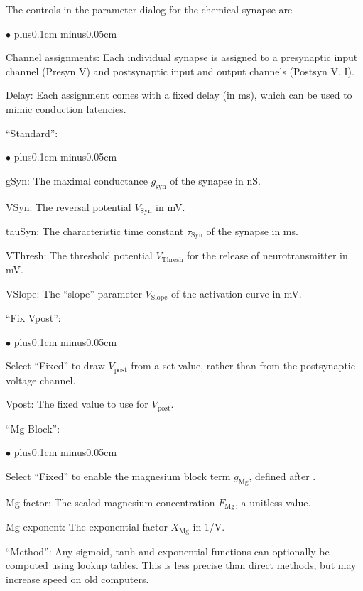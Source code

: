 \documentclass{article}
\newenvironment{myitem}{\begin{list}{$\bullet$}{\setlength{\leftmargin}{1.1em}
\itemsep0.1cm plus0.1cm minus0.05cm
\listparindent0cm
\addtolength{\labelsep}{0.5\labelsep}
\setlength{\labelwidth}{0.8em}
\setlength{\leftmargin}{\labelwidth}
\addtolength{\leftmargin}{\labelsep}
}}{\end{list}}
\begin{document}
  The controls in the parameter dialog for the chemical synapse are
  \begin{myitem}
  \item Channel assignments: Each individual synapse is assigned to a presynaptic input channel
  (Presyn V) and postsynaptic input and output channels (Postsyn V, I).
  \item Delay: Each assignment comes with a fixed delay (in ms), which can be used to mimic
  conduction latencies.
\end{myitem}
``Standard'':
\begin{myitem}
  \item gSyn: The maximal conductance $g_{\text{syn}}$ of the synapse in nS. 
  \item VSyn: The reversal potential $V_{\text{Syn}}$ in mV. 
\item tauSyn: The characteristic time constant $\tau_{\text{Syn}}$ of
  the synapse in ms.  
\item VThresh: The threshold  potential $V_{\text{Thresh}}$ for the
  release of neurotransmitter in mV.  
\item VSlope: The ``slope'' parameter $V_{\text{Slope}}$ of the
  activation curve in mV.  
  \end{myitem}
``Fix Vpost'':
\begin{myitem}
	\item Select ``Fixed'' to draw $V_{\text{post}}$ from a set value, rather than from the
	postsynaptic voltage channel.
	\item Vpost: The fixed value to use for $V_{\text{post}}$.
\end{myitem}
``Mg Block'':
\begin{myitem}
	\item Select ``Fixed'' to enable the magnesium block term $g_{\text{Mg}}$, defined
	after \cite{FellousSejnowski2003}.
	\item Mg factor: The scaled magnesium concentration $F_{\text{Mg}}$, a unitless value.
	\item Mg exponent: The exponential factor $X_{\text{Mg}}$ in 1/V.
\end{myitem}
``Method'': Any sigmoid, tanh and exponential functions can optionally be computed using
lookup tables. This is less precise than direct methods, but may increase speed
on old computers.
\end{document}
